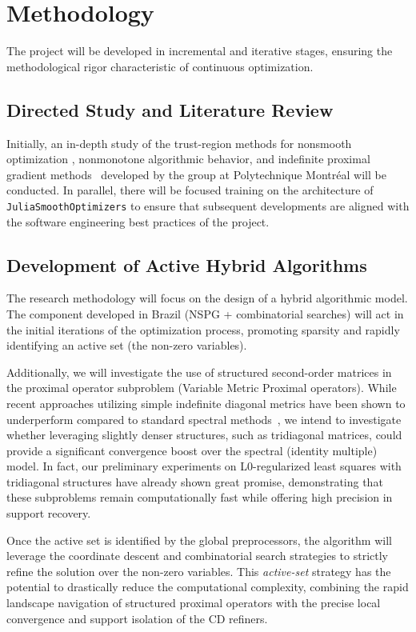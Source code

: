 \section{Methodology}

The project will be developed in incremental and iterative stages, ensuring the methodological rigor characteristic of continuous optimization.

\subsection{Directed Study and Literature Review}
Initially, an in-depth study of the trust-region methods for nonsmooth optimization \cite{leconte2023complexity}, nonmonotone algorithmic behavior, and indefinite proximal gradient methods~\cite{Leconte_2024} developed by the group at Polytechnique Montréal will be conducted. In parallel, there will be focused training on the architecture of \texttt{JuliaSmoothOptimizers} to ensure that subsequent developments are aligned with the software engineering best practices of the project.

\subsection{Development of Active Hybrid Algorithms}
The research methodology will focus on the design of a hybrid algorithmic model. The component developed in Brazil (NSPG + combinatorial searches) will act in the initial iterations of the optimization process, promoting sparsity and rapidly identifying an active set (the non-zero variables).

Additionally, we will investigate the use of structured second-order matrices in the proximal operator subproblem (Variable Metric Proximal operators). While recent approaches utilizing simple indefinite diagonal metrics have been shown to underperform compared to standard spectral methods~\cite{Leconte_2024}, we intend to investigate whether leveraging slightly denser structures, such as tridiagonal matrices, could provide a significant convergence boost over the spectral (identity multiple) model. In fact, our preliminary experiments on L0-regularized least squares with tridiagonal structures have already shown great promise, demonstrating that these subproblems remain computationally fast while offering high precision in support recovery.

Once the active set is identified by the global preprocessors, the algorithm will leverage the coordinate descent and combinatorial search strategies to strictly refine the solution over the non-zero variables. This \textit{active-set} strategy has the potential to drastically reduce the computational complexity, combining the rapid landscape navigation of structured proximal operators with the precise local convergence and support isolation of the CD refiners.

